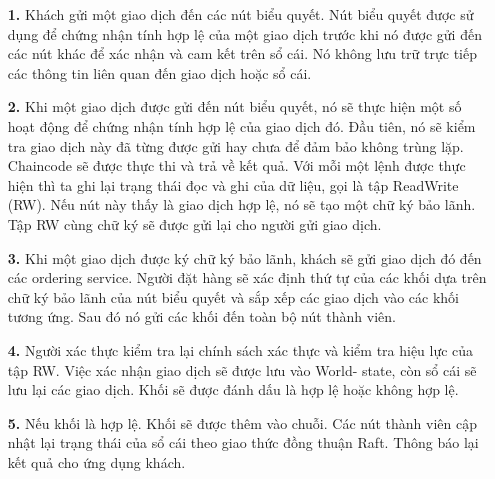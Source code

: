 \begin{itemize}
    \item[\textbf{1.}] Khách gửi một giao dịch đến các  nút biểu quyết. Nút biểu quyết được sử dụng để chứng nhận tính hợp 
    lệ của một giao dịch trước khi nó được gửi đến các nút khác để xác nhận và cam kết trên 
    sổ cái. Nó không lưu trữ trực tiếp các thông tin liên quan đến giao dịch hoặc sổ cái.
    \item[\textbf{2.}] Khi một giao dịch được gửi đến nút biểu quyết, nó sẽ thực hiện một số hoạt 
    động để chứng nhận tính hợp lệ của giao dịch đó. Đầu tiên, nó sẽ kiểm 
    tra giao dịch này đã từng được gửi hay chưa để đảm bảo không trùng lặp. Chaincode sẽ được thực thi
    và trả về kết quả. Với mỗi một lệnh được thực hiện thì ta ghi lại 
    trạng thái đọc và ghi của dữ liệu, gọi là tập ReadWrite (RW).
    Nếu nút này thấy là giao dịch hợp lệ, nó sẽ tạo một chữ ký bảo lãnh. Tập RW cùng chữ ký sẽ được gửi lại cho người 
    gửi giao dịch. 
    \item[\textbf{3.}] Khi một giao dịch được ký chữ ký bảo lãnh, khách sẽ gửi giao dịch
    đó đến các ordering service. Người đặt hàng sẽ xác định thứ tự của các khối dựa trên 
    chữ ký bảo lãnh của nút biểu quyết và sắp xếp các giao dịch vào các khối tương 
    ứng. Sau đó nó gửi các khối đến toàn bộ nút thành viên.
    \item[\textbf{4.}] Người xác thực kiểm tra lại chính sách xác thực và kiểm tra hiệu lực của tập RW. Việc xác nhận giao dịch sẽ được lưu vào World- state, còn sổ cái sẽ lưu lại các giao dịch. 
    Khối sẽ được đánh dấu là hợp lệ hoặc không hợp lệ.
    \item[\textbf{5.}] Nếu khối là hợp lệ. Khối sẽ được thêm vào chuỗi. Các nút thành viên cập nhật lại trạng thái của sổ cái theo giao thức đồng thuận Raft.
    Thông báo lại kết quả cho ứng dụng khách. \cite{hyperledger}
\end{itemize}
